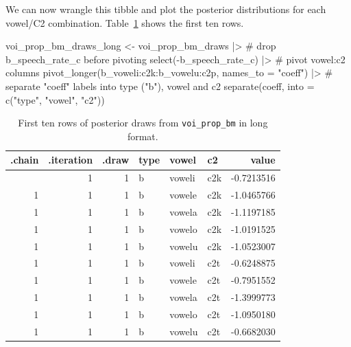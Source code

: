 \documentclass[
  authoryear,
  preprint,
  3p]{elsarticle}
\newenvironment{Shaded}{\begin{snugshade}}{\end{snugshade}}
\newcommand{\AttributeTok}[1]{\textcolor[rgb]{0.40,0.45,0.13}{#1}}
\newcommand{\CommentTok}[1]{\textcolor[rgb]{0.37,0.37,0.37}{#1}}
\newcommand{\FunctionTok}[1]{\textcolor[rgb]{0.28,0.35,0.67}{#1}}
\newcommand{\NormalTok}[1]{\textcolor[rgb]{0.00,0.23,0.31}{#1}}
\newcommand{\OtherTok}[1]{\textcolor[rgb]{0.00,0.23,0.31}{#1}}
\newcommand{\SpecialCharTok}[1]{\textcolor[rgb]{0.37,0.37,0.37}{#1}}
\newcommand{\StringTok}[1]{\textcolor[rgb]{0.13,0.47,0.30}{#1}}
\begin{document}
We can now wrangle this tibble and plot the posterior distributions for
each vowel/C2 combination. Table~\ref{tbl-voi-long} shows the first ten
rows.

\begin{Shaded}
\begin{Highlighting}[]
\NormalTok{voi\_prop\_bm\_draws\_long }\OtherTok{\textless{}{-}}\NormalTok{ voi\_prop\_bm\_draws }\SpecialCharTok{|\textgreater{}} 
  \CommentTok{\# drop b\_speech\_rate\_c before pivoting}
  \FunctionTok{select}\NormalTok{(}\SpecialCharTok{{-}}\NormalTok{b\_speech\_rate\_c) }\SpecialCharTok{|\textgreater{}} 
  \CommentTok{\# pivot vowel:c2 columns}
  \FunctionTok{pivot\_longer}\NormalTok{(}\StringTok{\textasciigrave{}}\AttributeTok{b\_voweli:c2k}\StringTok{\textasciigrave{}}\SpecialCharTok{:}\StringTok{\textasciigrave{}}\AttributeTok{b\_vowelu:c2p}\StringTok{\textasciigrave{}}\NormalTok{, }\AttributeTok{names\_to =} \StringTok{"coeff"}\NormalTok{) }\SpecialCharTok{|\textgreater{}} 
  \CommentTok{\# separate "coeff" labels into type ("b"), vowel and c2}
  \FunctionTok{separate}\NormalTok{(coeff, }\AttributeTok{into =} \FunctionTok{c}\NormalTok{(}\StringTok{"type"}\NormalTok{, }\StringTok{"vowel"}\NormalTok{, }\StringTok{"c2"}\NormalTok{))}
\end{Highlighting}
\end{Shaded}

\begin{longtable}[]{@{}rrrlllr@{}}

\caption{\label{tbl-voi-long}First ten rows of posterior draws from
\texttt{voi\_prop\_bm} in long format.}

\tabularnewline

\toprule\noalign{}
.chain & .iteration & .draw & type & vowel & c2 & value \\
\midrule\noalign{}
\endhead
\bottomrule\noalign{}
\endlastfoot
1 & 1 & 1 & b & voweli & c2k & -0.7213516 \\
1 & 1 & 1 & b & vowele & c2k & -1.0465766 \\
1 & 1 & 1 & b & vowela & c2k & -1.1197185 \\
1 & 1 & 1 & b & vowelo & c2k & -1.0191525 \\
1 & 1 & 1 & b & vowelu & c2k & -1.0523007 \\
1 & 1 & 1 & b & voweli & c2t & -0.6248875 \\
1 & 1 & 1 & b & vowele & c2t & -0.7951552 \\
1 & 1 & 1 & b & vowela & c2t & -1.3999773 \\
1 & 1 & 1 & b & vowelo & c2t & -1.0950180 \\
1 & 1 & 1 & b & vowelu & c2t & -0.6682030 \\

\end{longtable}
\end{document}
